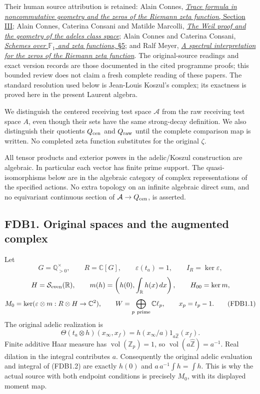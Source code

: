 Their human source attribution is retained: Alain Connes,
\href{https://arxiv.org/abs/math/9811068v1}{\emph{Trace formula in
noncommutative geometry and the zeros of the Riemann zeta function},
Section III}; Alain Connes, Caterina Consani and Matilde Marcolli,
\href{https://arxiv.org/abs/math/0703392v1}{\emph{The Weil proof and the
geometry of the adeles class space}}; Alain Connes and Caterina Consani,
\href{https://arxiv.org/abs/0903.2024v3}{\emph{Schemes over
\(\mathbb F_1\) and zeta functions}, §5}; and Ralf Meyer,
\href{https://arxiv.org/abs/math/0412277v3}{\emph{A spectral
interpretation for the zeros of the Riemann zeta function}}. The
original-source readings and exact version records are those documented
in the cited programme proofs; this bounded review does not claim a
fresh complete reading of these papers. The standard resolution used
below is Jean-Louis Koszul's complex; its exactness is proved here in
the present Laurent algebra.

We distinguish the centered receiving test space \(\mathcal A\) from the
raw receiving test space \(A\), even though their sets have the same
strong-decay definition. We also distinguish their quotients
\(Q_{\rm cen}\) and \(Q_{\rm raw}\) until the complete comparison map is
written. No completed zeta function substitutes for the original
\(\zeta\).

All tensor products and exterior powers in the adelic/Koszul
construction are algebraic. In particular each vector has finite prime
support. The quasi-isomorphisms below are in the algebraic category of
complex representations of the specified actions. No extra topology on
an infinite algebraic direct sum, and no equivariant continuous section
of \(\mathcal A\to Q_{\rm cen}\), is asserted.

\subsection{FDB1. Original spaces and the augmented
complex}\label{fdb1.-original-spaces-and-the-augmented-complex}

Let \[
G=\mathbb Q_{>0}^{\times},\qquad R=\mathbb C[G],\qquad
\varepsilon(t_a)=1,\qquad I_R=\ker\varepsilon,
\] \[
H=\mathcal S_{\rm even}(\mathbb R),\qquad
m(h)=\left(h(0),\int_{\mathbb R}h(x)\,dx\right),\qquad
H_{00}=\ker m,
\] \[
M_0=\ker(\varepsilon\otimes m:R\otimes H\to\mathbb C^2),
\qquad W=\bigoplus_{p\ {\rm prime}}\mathbb C\ell_p,\qquad
x_p=t_p-1.
\tag{FDB1.1}
\] The original adelic realization is \[
\Theta(t_a\otimes h)(x_\infty,x_f)
=h(x_\infty/a)1_{a\widehat{\mathbb Z}}(x_f).
\tag{FDB1.2}
\] Finite additive Haar measure has
\(\operatorname{vol}(\mathbb Z_p)=1\), so
\(\operatorname{vol}(a\widehat{\mathbb Z})=a^{-1}\). Real dilation in
the integral contributes \(a\). Consequently the original adelic
evaluation and integral of (FDB1.2) are exactly \(h(0)\) and
\(a\,a^{-1}\int h=\int h\). This is why the actual source with both
endpoint conditions is precisely \(M_0\), with its displayed moment map.


